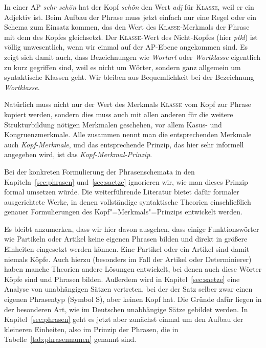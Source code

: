 In einer AP \textit{sehr schön} hat der Kopf \textit{schön} den Wert \textit{adj} für \textsc{Klasse}, weil er ein Adjektiv ist.
Beim Aufbau der Phrase muss jetzt einfach nur eine Regel oder ein Schema zum Einsatz kommen, das den Wert des \textsc{Klasse}-Merkmals der Phrase mit dem des Kopfes gleichsetzt.
Der \textsc{Klasse}-Wert des Nicht-Kopfes (hier \textit{ptkl}) ist völlig unwesentlich, wenn wir einmal auf der AP-Ebene angekommen sind.
Es zeigt sich damit auch, dass Bezeichnungen wie \textit{Wortart} oder \textit{Wortklasse} eigentlich zu kurz gegriffen sind, weil es nicht um Wörter, sondern ganz allgemein um syntaktische Klassen geht.
Wir bleiben aus Bequemlichkeit bei der Bezeichnung \textit{Wortklasse}.

Natürlich muss nicht nur der Wert des Merkmals \textsc{Klasse} vom Kopf zur Phrase kopiert werden, sondern dies muss auch mit allen anderen für die weitere Strukturbildung nötigen Merkmalen geschehen, vor allem Kasus- und Kongruenzmerkmale.
Alle zusammen nennt man die entsprechenden Merkmale auch \textit{Kopf-Merkmale}, und das entsprechende Prinzip, das hier sehr informell angegeben wird, ist das \textit{Kopf-Merkmal-Prinzip}.


Bei der konkreten Formulierung der Phrasenschemata in den Kapiteln~\ref{sec:phrasen} und~\ref{sec:saetze} ignorieren wir, wie man dieses Prinzip formal umsetzen würde.
Die weiterführende Literatur bietet dafür formaler ausgerichtete Werke, in denen vollständige syntaktische Theorien einschließlich genauer Formulierungen des Kopf"=Merkmals"=Prinzips entwickelt werden.

Es bleibt anzumerken, dass wir hier davon ausgehen, dass einige Funktionswörter wie Partikeln oder Artikel keine eigenen Phrasen bilden und direkt in größere Einheiten eingesetzt werden können.
Eine Partikel oder ein Artikel sind damit niemals Köpfe.
Auch hierzu (besonders im Fall der Artikel oder Determinierer) haben manche Theorien andere Lösungen entwickelt, bei denen auch diese Wörter Köpfe sind und Phrasen bilden.
Außerdem wird in Kapitel~\ref{sec:saetze} eine Analyse von unabhängigen Sätzen vertreten, bei der der Satz selber zwar einen eigenen Phrasentyp (Symbol S), aber keinen Kopf hat.
Die Gründe dafür liegen in der besonderen Art, wie im Deutschen unabhängige Sätze gebildet werden.
In Kapitel~\ref{sec:phrasen} geht es jetzt aber zunächst einmal um den Aufbau der kleineren Einheiten, also im Prinzip der Phrasen, die in Tabelle~\ref{tab:phrasennamen} genannt sind.


